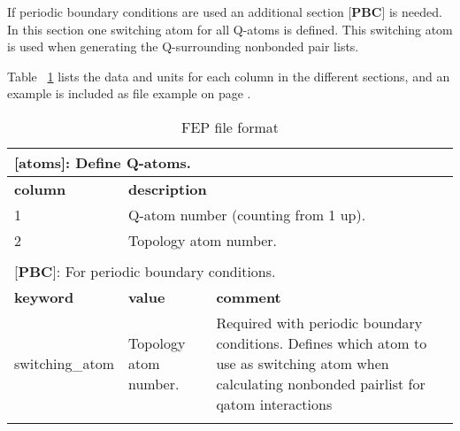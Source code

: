 \documentclass[a4paper,11pt]{article}
\let\origref\ref
\def\ref#1{\unskip~\origref{#1}}
\begin{document}
If  periodic  boundary  conditions  are  used  an  additional  section
[\textbf{PBC}] is needed.  In this section one switching  atom for all
Q-atoms is  defined. This switching  atom is used when  generating the
Q-surrounding nonbonded pair lists.

Table \ref{tab:fepfileformat} lists the data and units for each column
in the different sections, and an  example is included as file example
on page \pageref{tab:FEP_file_f_p_t_r}.

\small
\begin{longtable}{|p{53pt}|p{181pt}|p{160pt}|}
\caption{FEP file format}
\label{tab:fepfileformat}
\endhead

\multicolumn{3}{p{394pt}}{[\textbf{atoms}]: Define Q-atoms.}\\
\hline \textbf{column} & \multicolumn{2}{p{341pt}|}{\textbf{description}}\\
\hline 1 & \multicolumn{2}{p{341pt}|}{Q-atom number (counting from 1 up).}\\
\hline 2 & \multicolumn{2}{p{341pt}|}{Topology atom number.}\\
\hline
\multicolumn{3}{p{394pt}}{}\\



\multicolumn{3}{p{394pt}}{[\textbf{PBC}]: For periodic boundary conditions.}\\
\hline \textbf{keyword} & \textbf{value} & \textbf{comment}\\
\hline switching\-\_atom & Topology atom number. & Required with periodic boundary conditions. Defines which atom to use as switching atom when calculating nonbonded pairlist for qatom interactions\\
\hline
\multicolumn{3}{p{394pt}}{}\\


\end{longtable}
\end{document}
